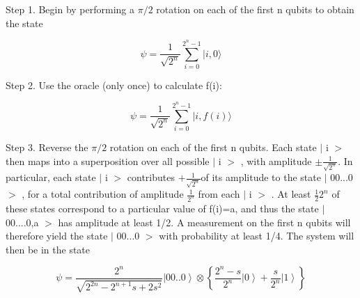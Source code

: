 \documentclass{article}
\begin{document}
Step 1. Begin by performing a $\pi/2$ rotation on each of the first n qubits
to obtain the state%

\begin{equation}
\psi=\frac{1}{\sqrt{2^{n}}}\sum\limits_{i=0}^{2^{n}-1}|i,0\rangle
\end{equation}

Step 2. Use the oracle (only once) to calculate f(i):%

\begin{equation}
\psi=\frac{1}{\sqrt{2^{n}}}\sum\limits_{i=0}^{2^{n}-1}|i,f(i)\rangle
\end{equation}

Step 3. Reverse the $\pi/2$ rotation on each of the first n qubits. Each
state
$\vert$%
i%
$>$%
then maps into a superposition over all possible
$\vert$%
i%
$>$%
, with amplitude $\pm\frac{1}{\sqrt{2^{n}}}$. In particular, each state
$\vert$%
i%
$>$%
contributes $+\frac{1}{\sqrt{2^{n}}}$of its amplitude to the state
$\vert$%
00...0%
$>$%
, for a total contribution of amplitude $\frac{1}{2^{n}}$ from each
$\vert$%
i%
$>$%
. At least $\frac{1}{2}2^{n}$ of these states correspond to a particular value
of f(i)=a, and thus the state
$\vert$%
00....0,a%
$>$%
has amplitude at least 1/2. A measurement on the first n qubits will therefore
yield the state
$\vert$%
00...0%
$>$%
with probability at least 1/4. The system will then be in the state%

\begin{equation}
\psi=\frac{2^{n}}{\sqrt{2^{2n}-2^{n+1}s+2s^{2}}}\left|  00..0\right\rangle
\otimes\left\{  \frac{2^{n}-s}{2^{n}}\left|  0\right\rangle +\frac{s}{2^{n}%
}\left|  1\right\rangle \right\}
\end{equation}
\end{document}
